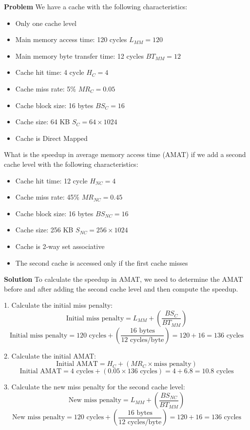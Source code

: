 \textbf{Problem}
We have a cache with the following characteristics:
\begin{itemize}
    \item Only one cache level
    \item Main memory access time: 120 cycles $L_{MM}=120$
    \item Main memory byte transfer time: 12 cycles $BT_{MM}=12$
    \item Cache hit time: 4 cycle $H_{C}=4$
    \item Cache miss rate: 5\% $MR_{C}=0.05$
    \item Cache block size: 16 bytes $BS_{C}=16$
    \item Cache size: 64 KB $S_{C}=64 \times 1024$
    \item Cache is Direct Mapped
\end{itemize}

What is the speedup in average memory access time (AMAT) if we add a second cache level with the following characteristics:
\begin{itemize}
    \item Cache hit time: 12 cycle $H_{NC}=4$
    \item Cache miss rate: 45\% $MR_{NC}=0.45$
    \item Cache block size: 16 bytes $BS_{NC}=16$
    \item Cache size: 256 KB $S_{NC}=256 \times 1024$
    \item Cache is 2-way set associative
    \item The second cache is accessed only if the first cache misses
\end{itemize}

\textbf{Solution}
To calculate the speedup in AMAT, we need to determine the AMAT before and after adding the second cache level and then compute the speedup.

1. Calculate the initial miss penalty:
\[
\text{Initial miss penalty} = L_{MM} + \left(\frac{BS_{C}}{BT_{MM}}\right)
\]
\[
\text{Initial miss penalty} = 120 \text{ cycles} + \left(\frac{16 \text{ bytes}}{12 \text{ cycles/byte}}\right) = 120 + 16 = 136 \text{ cycles}
\]

2. Calculate the initial AMAT:
\[
\text{Initial AMAT} = H_{C} + (MR_{C} \times \text{miss penalty})
\]
\[
\text{Initial AMAT} = 4 \text{ cycles} + (0.05 \times 136 \text{ cycles}) = 4 + 6.8 = 10.8 \text{ cycles}
\]

3. Calculate the new miss penalty for the second cache level:
\[
\text{New miss penalty} = L_{MM} + \left(\frac{BS_{NC}}{BT_{MM}}\right)
\]
\[
\text{New miss penalty} = 120 \text{ cycles} + \left(\frac{16 \text{ bytes}}{12 \text{ cycles/byte}}\right) = 120 + 16 = 136 \text{ cycles}
\]

